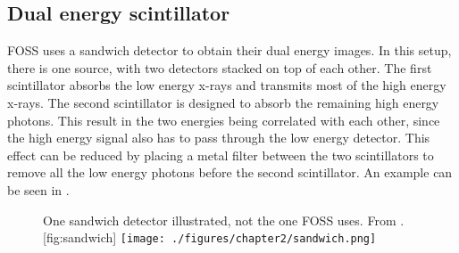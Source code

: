 \subsection{Dual energy scintillator}
FOSS uses a sandwich detector to obtain their dual energy images. 
In this setup, there is one source, with two detectors stacked on top of each other.
The first scintillator absorbs the low energy x-rays and transmits most of the high energy x-rays. 
The second scintillator is designed to absorb the remaining high energy photons.
This result in the two energies being correlated with each other, since the high energy signal also has to pass through the low energy detector.
This effect can be reduced by placing a metal filter between the two scintillators to remove all the low energy photons before the second scintillator.
An example can be seen in .

\newpage
\begin{figure}[h]
	\begin{sidecaption}{One sandwich detector illustrated, not the one FOSS uses. From \cite{sheferStateArtCT2013}.}[fig:sandwich]
		\centering
		\texttt{[image: ./figures/chapter2/sandwich.png]}
	\end{sidecaption}
\end{figure}
